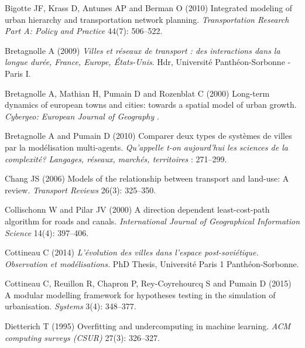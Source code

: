 \documentclass{article}
\begin{document}
\begin{thebibliography}{51}
Bigotte JF, Krass D, Antunes AP and Berman O (2010) Integrated modeling of
  urban hierarchy and transportation network planning.
\newblock \emph{Transportation Research Part A: Policy and Practice} 44(7):
  506--522.

Bretagnolle A (2009) \emph{{Villes et r{\'e}seaux de transport : des
  interactions dans la longue dur{\'e}e, France, Europe, {\'E}tats-Unis}}.
\newblock Hdr, Universit{\'e} Panth{\'e}on-Sorbonne - Paris I.

Bretagnolle A, Mathian H, Pumain D and Rozenblat C (2000) Long-term dynamics of
  european towns and cities: towards a spatial model of urban growth.
\newblock \emph{Cybergeo: European Journal of Geography} .

Bretagnolle A and Pumain D (2010) Comparer deux types de syst{\`e}mes de villes
  par la mod{\'e}lisation multi-agents.
\newblock \emph{Qu'appelle t-on aujourd'hui les sciences de la complexit{\'e}?
  Langages, r{\'e}seaux, march{\'e}s, territoires} : 271--299.

Chang JS (2006) Models of the relationship between transport and land-use: A
  review.
\newblock \emph{Transport Reviews} 26(3): 325--350.

Collischonn W and Pilar JV (2000) A direction dependent least-cost-path
  algorithm for roads and canals.
\newblock \emph{International Journal of Geographical Information Science}
  14(4): 397--406.

Cottineau C (2014) \emph{L'{\'e}volution des villes dans l'espace
  post-sovi{\'e}tique. Observation et mod{\'e}lisations.}
\newblock PhD Thesis, Universit{\'e} Paris 1 Panth{\'e}on-Sorbonne.

Cottineau C, Reuillon R, Chapron P, Rey-Coyrehourcq S and Pumain D (2015) A
  modular modelling framework for hypotheses testing in the simulation of
  urbanisation.
\newblock \emph{Systems} 3(4): 348--377.

Dietterich T (1995) Overfitting and undercomputing in machine learning.
\newblock \emph{ACM computing surveys (CSUR)} 27(3): 326--327.


\end{thebibliography}
\end{document}
